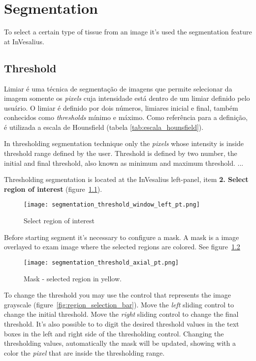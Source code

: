 \chapter{Segmentation}

To select a certain type of tissue from an image it's used the segmentation feature at InVesalius.

\section{Threshold}

Limiar é uma técnica de segmentação de imagens que permite selecionar da imagem somente os \textit{pixels} cuja intensidade está dentro de um limiar definido pelo usuário.  O limiar é definido por dois números, limiares inicial e final, também conhecidos como \textit{thresholds} mínimo e máximo. Como referência para a definição, é utilizada a escala de Hounsfield (tabela \ref{tab:escala_hounsfield}).

In thresholding segmentation technique only the \textit{pixels} whose intensity is inside threshold range defined by the user. Threshold is defined by two number, the initial and final threshold, also known as minimum and maximum threshold. ...

Thresholding segmentation is located at the InVesalius left-panel, item \textbf{2. Select region of interest} (figure~\ref{fig:region_selection}).

\begin{figure}[!htb]
\centering
\texttt{[image: segmentation\_threshold\_window\_left\_pt.png]}
\caption{Select region of interest}
\label{fig:region_selection}
\end{figure}

Before starting segment it's necessary to configure a mask. A mask is a image overlayed to exam image where the selected regions are colored. See figure~\ref{fig:region_selection_masc}

\begin{figure}[!htb]
\centering
\texttt{[image: segmentation\_threshold\_axial\_pt.png]}
\caption{Mask - selected region in yellow.}
\label{fig:region_selection_masc}
\end{figure}

To change the threshold you may use the control that represents the image grayscale (figure~\ref{fig:region_selection_bar}). Move the \textit{left} sliding control to change the initial threshold. Move the \textit{right} sliding control to change the final threshold. It's also possible to to digit the desired threshold values in the text boxes in the left and right side of the thresholding control. Changing the thresholding values, automatically the mask will be updated, showing with a color the \textit{pixel} that are inside the thresholding range.


